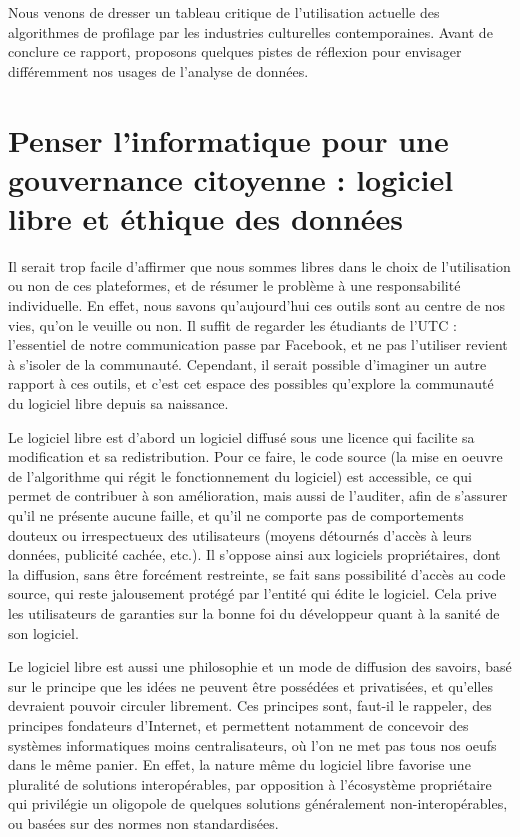 \documentclass[a4paper,12pt]{report}
\begin{document}
Nous venons de dresser un tableau critique de l'utilisation actuelle des algorithmes de profilage par les industries culturelles contemporaines. Avant de conclure ce rapport, proposons quelques pistes de réflexion pour envisager différemment nos usages de l'analyse de données.

\section{Penser l'informatique pour une gouvernance citoyenne : logiciel libre et éthique des données}

Il serait trop facile d'affirmer que nous sommes libres dans le choix de l'utilisation ou non de ces plateformes, et de résumer le problème à une responsabilité individuelle. En effet, nous savons qu'aujourd'hui ces outils sont au centre de nos vies, qu'on le veuille ou non. Il suffit de regarder les étudiants de l'UTC : l'essentiel de notre communication passe par Facebook, et ne pas l'utiliser revient à s'isoler de la communauté. Cependant, il serait possible d'imaginer un autre rapport à ces outils, et c'est cet espace des possibles qu'explore la communauté du logiciel libre depuis sa naissance.

Le logiciel libre est d'abord un logiciel diffusé sous une licence qui facilite sa modification et sa redistribution. Pour ce faire, le code source (la mise en oeuvre de l'algorithme qui régit le fonctionnement du logiciel) est accessible, ce qui permet de contribuer à son amélioration, mais aussi de l'auditer, afin de s'assurer qu'il ne présente aucune faille, et qu'il ne comporte pas de comportements douteux ou irrespectueux des utilisateurs (moyens détournés d'accès à leurs données, publicité cachée, etc.). Il s'oppose ainsi aux logiciels propriétaires, dont la diffusion, sans être forcément restreinte, se fait sans possibilité d'accès au code source, qui reste jalousement protégé par l'entité qui édite le logiciel. Cela prive les utilisateurs de garanties sur la bonne foi du développeur quant à la sanité de son logiciel.

Le logiciel libre est aussi une philosophie et un mode de diffusion des savoirs, basé sur le principe que les idées ne peuvent être possédées et privatisées, et qu'elles devraient pouvoir circuler librement. Ces principes sont, faut-il le rappeler, des principes fondateurs d'Internet, et permettent notamment de concevoir des systèmes informatiques moins centralisateurs, où l'on ne met pas tous nos oeufs dans le même panier. En effet, la nature même du logiciel libre favorise une pluralité de solutions interopérables, par opposition à l'écosystème propriétaire qui privilégie un oligopole de quelques solutions généralement non-interopérables, ou basées sur des normes non standardisées.
\end{document}
